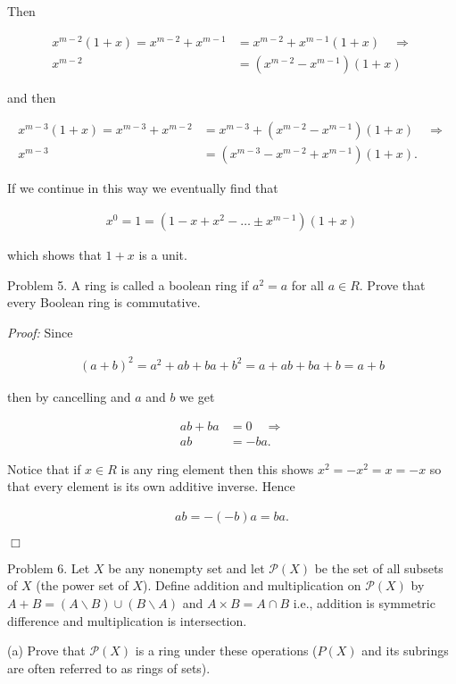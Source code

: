 \documentclass{article}
\begin{document}
  Then

  \begin{align*}
    x^{m-2}(1+x) =x^{m-2}+x^{m-1} &= x^{m-2}+x^{m-1}(1+x) \quad \Rightarrow\\
    x^{m-2} &= (x^{m-2}-x^{m-1})(1+x)
  \end{align*}

  and then

  \begin{align*}
    x^{m-3}(1+x) = x^{m-3}+x^{m-2} &= x^{m-3} + (x^{m-2}-x^{m-1})(1+x) \quad \Rightarrow \\
    x^{m-3} &= (x^{m-3}-x^{m-2}+x^{m-1})(1+x).
  \end{align*}

  If we continue in this way we eventually find that

  \begin{align*}
    x^0 = 1 = (1-x+x^2-\dots \pm x^{m-1})(1+x)
  \end{align*}

  which shows that $1+x$ is a unit.

  \pagebreak

  {\Large \color{Sepia} Problem 5.  A ring is called a boolean ring if $a^2=a$ for all $a\in R$.  Prove that every Boolean ring is commutative.}

  {\it Proof:} Since

  \begin{align*}
    (a+b)^2 = a^2 + ab + ba + b^2 = a+ab+ba+b = a+b
  \end{align*}

  then by cancelling and $a$ and $b$ we get

  \begin{align*}
    ab+ba &= 0 \quad \Rightarrow \\
    ab &= -ba.
  \end{align*}

  Notice that if $x\in R$ is any ring element then this shows $x^2 = -x^2 = x = -x$ so that every element is its own additive inverse.  Hence

  \begin{align*}
    ab = -(-b)a = ba.
  \end{align*}

  $\Box$

  \pagebreak

  {\Large \color{Sepia} Problem 6.  Let $X$ be any nonempty set and let $\mathcal P(X)$ be the set of all subsets of $X$ (the power set of $X$).  Define addition and multiplication on $\mathcal P(X)$ by $A+B= (A\smallsetminus B)\cup(B\smallsetminus A)$ and $A\times B=A\cap B$ i.e., addition is symmetric difference and multiplication is intersection.

  (a)  Prove that $\mathcal P(X)$ is a ring under these operations ($P(X)$ and its subrings are often referred to as rings of sets).}
\end{document}
